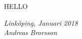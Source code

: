 \begin{acknowledgments}
 HELLO

  \addvspace{1em}
  \begin{flushright}
    \textit{%
      Link\"{o}ping, Januari 2018\\
      Andreas Brorsson%
    }
  \end{flushright}
\end{acknowledgments}
